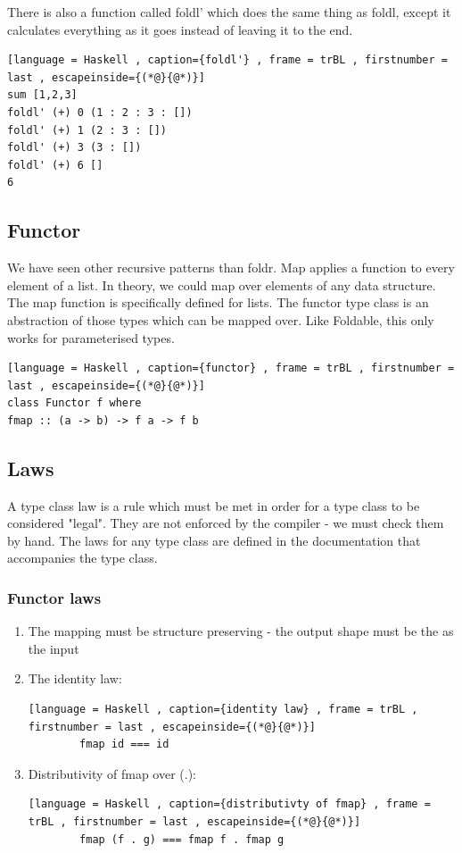 \documentclass[a4paper]{article}
\theoremstyle{plain}
\theoremstyle{definition}
\theoremstyle{remark}
\begin{document}
There is also a function called foldl' which does the same thing as foldl, except it calculates everything as it goes instead of leaving it to the end.
\begin{lstlisting}[language = Haskell , caption={foldl'} , frame = trBL , firstnumber = last , escapeinside={(*@}{@*)}]
sum [1,2,3]
foldl' (+) 0 (1 : 2 : 3 : [])
foldl' (+) 1 (2 : 3 : [])
foldl' (+) 3 (3 : [])
foldl' (+) 6 []
6
\end{lstlisting}
\subsection{Functor}
We have seen other recursive patterns than foldr. Map applies a function to every element of a list. In theory, we could map over elements of any data structure. The map function is specifically defined for lists. The functor type class is an abstraction of those types which can be mapped over. Like Foldable, this only works for parameterised types.
\begin{lstlisting}[language = Haskell , caption={functor} , frame = trBL , firstnumber = last , escapeinside={(*@}{@*)}]
class Functor f where
fmap :: (a -> b) -> f a -> f b
\end{lstlisting}
\subsection{Laws}
A type class law is a rule which must be met in order for a type class to be considered "legal". They are not enforced by the compiler - we must check them by hand. The laws for any type class are defined in the documentation that accompanies the type class.
\subsubsection{Functor laws}
\begin{enumerate}
	\item The mapping must be structure preserving - the output shape must be the as the input
	\item The identity law: 
		\begin{lstlisting}[language = Haskell , caption={identity law} , frame = trBL , firstnumber = last , escapeinside={(*@}{@*)}]
		fmap id === id
		\end{lstlisting}
	\item Distributivity of fmap over (.):
		\begin{lstlisting}[language = Haskell , caption={distributivty of fmap} , frame = trBL , firstnumber = last , escapeinside={(*@}{@*)}]
		fmap (f . g) === fmap f . fmap g
		\end{lstlisting}
\end{enumerate}
\end{document}
